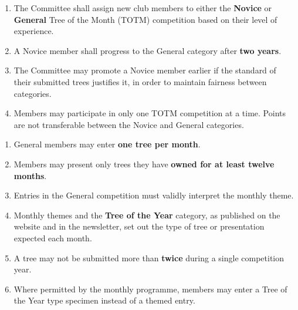 \setcounter{TOTMsection}{0} %

\renewcommand{\theenumi}{\arabic{TOTMsection}.\arabic{enumi}}
\renewcommand{\labelenumi}{\theenumi}

\label{2025-11-rules}
\setcounter{TOTMsection}{1} %
\begin{enumerate}
    \item The Committee shall assign new club members to either the \textbf{Novice} or \textbf{General} Tree of the Month (TOTM) competition based on their level of experience.
    \item A Novice member shall progress to the General category after \textbf{two years}.
    \item The Committee may promote a Novice member earlier if the standard of their submitted trees justifies it, in order to maintain fairness between categories.
    \item Members may participate in only one TOTM competition at a time. Points are not transferable between the Novice and General categories.
\end{enumerate}

\setcounter{TOTMsection}{2} %
\begin{enumerate}
    \item General members may enter \textbf{one tree per month}.
    \item Members may present only trees they have \textbf{owned for at least twelve months}.
    \item Entries in the General competition must validly interpret the monthly theme.
    \item Monthly themes and the \textbf{Tree of the Year} category, as published on the website and in the newsletter, set out the type of tree or presentation expected each month.
    \item A tree may not be submitted more than \textbf{twice} during a single competition year.
    \item Where permitted by the monthly programme, members may enter a Tree of the Year type specimen instead of a themed entry.
\end{enumerate}

